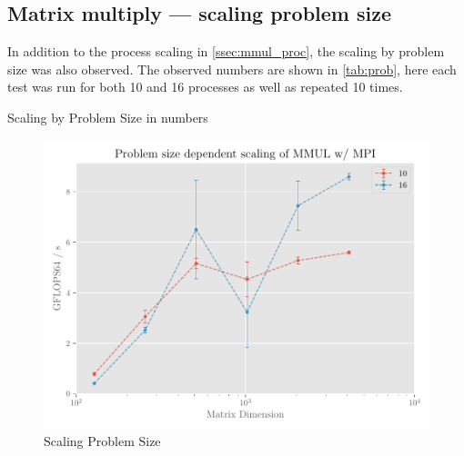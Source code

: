 \documentclass[]{scrartcl}
\begin{document}
\subsection{Matrix multiply --- scaling problem size}
In addition to the process scaling in \autoref{ssec:mmul_proc}, the scaling by problem size was also observed. The observed numbers are shown in \autoref{tab:prob}, here each test was run for both 10 and 16 processes as well as repeated 10 times.

\begin{table}[ht]
    \centering
    
    \caption{Scaling by Problem Size in numbers}\label{tab:prob}
\end{table}
\begin{figure}[H]
    \centering
    \includegraphics[width=\linewidth]{img/scaling_prob.pdf}
    \caption{Scaling Problem Size}%
    \label{fig:scaling_prob}
\end{figure}
\end{document}
